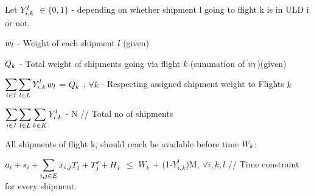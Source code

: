 \documentclass[english]{article}
\begin{document}
\begin{flushleft}
Let $\textcolor{black}{Y_{i,k}^{l}}$ $\in\{0,1\}$ - depending on whether shipment l going to flight k is in ULD i or not.

$\textcolor{black}{w_{l}}$ - Weight of each shipment \textcolor{black}{$l$} (given)

$\textcolor{black}{Q_{k}}$ - Total weight of shipments going via flight \textcolor{black}{$k$} (summation of $\textcolor{black}{w_{l}}$)(given)

$\textcolor{black}{\displaystyle \sum_{i\in I} \sum_{l\in L}Y_{i,k}^{l}}$$\textcolor{black}{w_{l}}$ = $\textcolor{black}{Q_{k}}$ , $\forall{k}$ - Respecting assigned shipment weight to Flights \textcolor{black}{$k$}

$\textcolor{black}{\displaystyle \sum_{i\in I} \sum_{l\in L} \sum_{k\in K}Y_{i,k}^{l}}$ - N // Total no of shipments

All shipments of flight k, should reach be available before time $\textcolor{black}{W_{k}}$:

$\textcolor{black}{a_{i}+s_{i}+{\displaystyle \sum_{i,j\in E}x_{i,j}T_{j}}}+{T_{j}^{\prime}}+{H_{j}}$ $\leq$ ${W_{k}}$ + (1-${Y_{i,k}^{l}}$)M, $\forall{i,k,l}$ // Time constraint for every shipment.

\end{flushleft}
\end{document}
